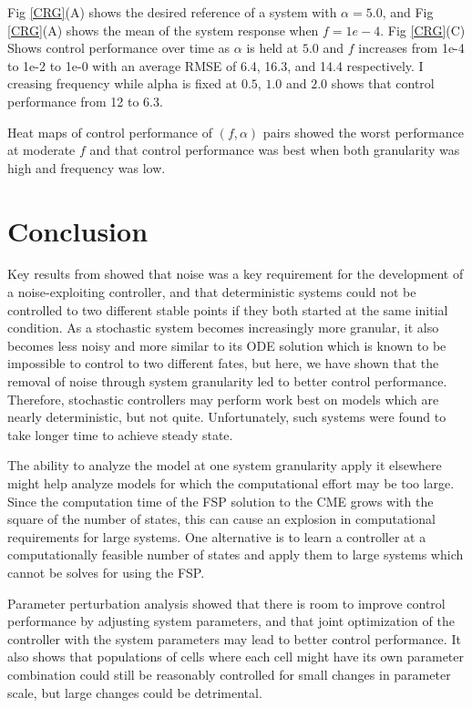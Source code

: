 \documentclass[12pt]{article}
\begin{document}
Fig \ref{CRG}(A) shows the desired reference of a system with $\alpha = 5.0$, and Fig \ref{CRG}(A) shows the mean of the system response when $f=1e-4$. Fig \ref{CRG}(C) Shows control performance over time as $\alpha$ is held at $5.0$ and $f$ increases from 1e-4 to 1e-2 to 1e-0 with an average RMSE of 6.4, 16.3, and 14.4 respectively. I creasing frequency while alpha is fixed at $0.5$, $1.0$ and $2.0$ shows that control performance from 12 to 6.3.

Heat maps of control performance of $(f,\alpha)$ pairs showed the worst performance at moderate $f$ and that control performance was best when both granularity was high and frequency was low.


\section{Conclusion}

Key results from \cite{May2021} showed that noise was a key requirement for the development of a noise-exploiting controller, and that deterministic systems could not be controlled to two different stable points if they both started at the same initial condition. As a stochastic system becomes increasingly more granular, it also becomes less noisy and more similar to its ODE solution which is known to be impossible to control to two different fates, but here, we have shown that the removal of noise through system granularity led to better control performance.  Therefore, stochastic controllers may perform work best on models which are nearly deterministic, but not quite. Unfortunately, such systems were found to take longer time to achieve steady state.

The ability to analyze the model at one system granularity apply it elsewhere might help analyze models for which the computational effort may be too large. Since the computation time of the FSP solution to the CME grows with the square of the number of states, this can cause an explosion in computational requirements for large systems. One alternative is to learn a controller at a computationally feasible number of states and apply them to large systems which cannot be solves for using the FSP. 

Parameter perturbation analysis showed that there is room to improve control performance by adjusting system parameters, and that joint optimization of the controller with the system parameters may lead to better control performance. It also shows that populations of cells where each cell might have its own parameter combination could still be reasonably controlled for small changes in parameter scale, but large changes could be detrimental.
\end{document}
